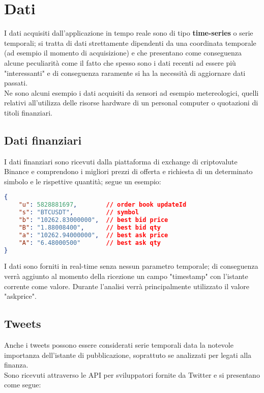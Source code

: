 \section{Dati}

I dati acquisiti dall'applicazione in tempo reale sono di tipo \textbf{time-series} o serie
temporali; si tratta di dati strettamente dipendenti da una coordinata temporale (ad esempio
il momento di acquisizione) e che presentano come conseguenza alcune peculiarità come il fatto
che spesso sono i dati recenti ad essere più "interessanti" e di conseguenza raramente si ha
la necessità di aggiornare dati passati.
\\
Ne sono alcuni esempio i dati acquisiti da sensori ad esempio metereologici, quelli relativi
all'utilizza delle risorse hardware di un personal computer o quotazioni di titoli finanziari.

\subsection{Dati finanziari}

I dati finanziari sono ricevuti dalla piattaforma di exchange di criptovalute Binance \cite{binance}
e comprendono i migliori prezzi di offerta e richiesta di un determinato simbolo e le rispettive
quantità; segue un esempio:

\begin{lstlisting}[language=json,firstnumber=1]
{
    "u": 5828881697,        // order book updateId
    "s": "BTCUSDT",         // symbol
    "b": "10262.83000000",  // best bid price
    "B": "1.88008400",      // best bid qty
    "a": "10262.94000000",  // best ask price
    "A": "6.48000500"       // best ask qty
}
\end{lstlisting}
%
I dati sono forniti in real-time senza nessun parametro temporale; di conseguenza verrà
aggiunto al momento della ricezione un campo "timestamp" con l'istante corrente come valore.
Durante l'analisi verrà principalmente utilizzato il valore "askprice".

\subsection{Tweets}

Anche i tweets possono essere considerati serie temporali data la notevole importanza
dell'istante di pubblicazione, soprattuto se analizzati per legati alla finanza.
\\
Sono ricevuti attraverso le API per sviluppatori fornite da Twitter \cite{twitter} e si
presentano come segue:

